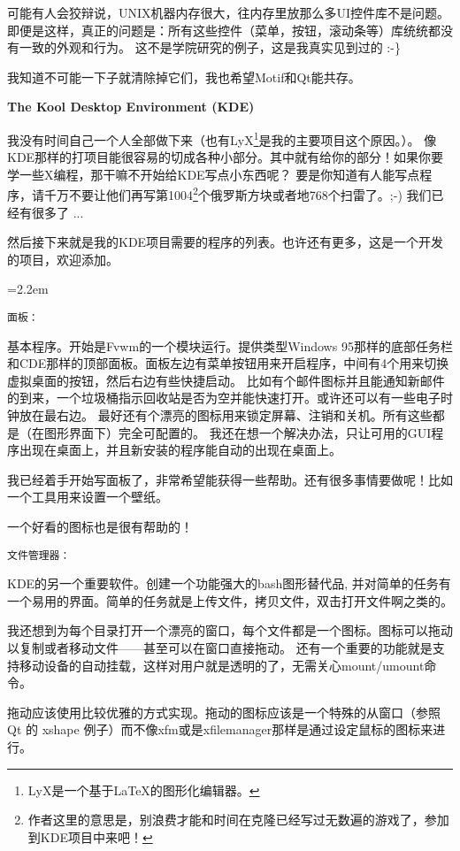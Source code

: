 \begin{insertnote}
可能有人会狡辩说，UNIX机器内存很大，往内存里放那么多UI控件库不是问题。即便是这样，真正的问题是：所有这些控件（菜单，按钮，滚动条等）库统统都没有一致的外观和行为。
这不是学院研究的例子，这是我真实见到过的 :-\}

我知道不可能一下子就清除掉它们，我也希望Motif和Qt能共存。


{\large \noindent \bf The Kool Desktop Environment (KDE)}

我没有时间自己一个人全部做下来（也有LyX\footnote{LyX是一个基于\LaTeX{}的图形化编辑器。}是我的主要项目这个原因。）。
像KDE那样的打项目能很容易的切成各种小部分。其中就有给你的部分！如果你要学一些X编程，那干嘛不开始给KDE写点小东西呢？
要是你知道有人能写点程序，请千万不要让他们再写第1004\footnote{作者这里的意思是，别浪费才能和时间在克隆已经写过无数遍的游戏了，参加到KDE项目中来吧！}个俄罗斯方块或者地768个扫雷了。;-) 我们已经有很多了 ... 

然后接下来就是我的KDE项目需要的程序的列表。也许还有更多，这是一个开发的项目，欢迎添加。

{
\leftskip=2.2em
\small 

{\noindent \tt 面板：}

    基本程序。开始是Fvwm的一个模块运行。提供类型Windows 95那样的底部任务栏和CDE那样的顶部面板。面板左边有菜单按钮用来开启程序，中间有4个用来切换虚拟桌面的按钮，然后右边有些快捷启动。
    比如有个邮件图标并且能通知新邮件的到来，一个垃圾桶指示回收站是否为空并能快速打开。或许还可以有一些电子时钟放在最右边。
    最好还有个漂亮的图标用来锁定屏幕、注销和关机。所有这些都是（在图形界面下）完全可配置的。
    我还在想一个解决办法，只让可用的GUI程序出现在桌面上，并且新安装的程序能自动的出现在桌面上。

    我已经着手开始写面板了，非常希望能获得一些帮助。还有很多事情要做呢！比如一个工具用来设置一个壁纸。
    
    一个好看的图标也是很有帮助的！

{ \noindent \tt 文件管理器：}

    KDE的另一个重要软件。创建一个功能强大的bash图形替代品, 并对简单的任务有一个易用的界面。简单的任务就是上传文件，拷贝文件，双击打开文件啊之类的。

    我还想到为每个目录打开一个漂亮的窗口，每个文件都是一个图标。图标可以拖动以复制或者移动文件——甚至可以在窗口直接拖动。
    还有一个重要的功能就是支持移动设备的自动挂载，这样对用户就是透明的了，无需关心mount/umount命令。

    拖动应该使用比较优雅的方式实现。拖动的图标应该是一个特殊的从窗口（参照 Qt 的 xshape 例子）而不像xfm或是xfilemanager那样是通过设定鼠标的图标来进行。

}
\end{insertnote}
